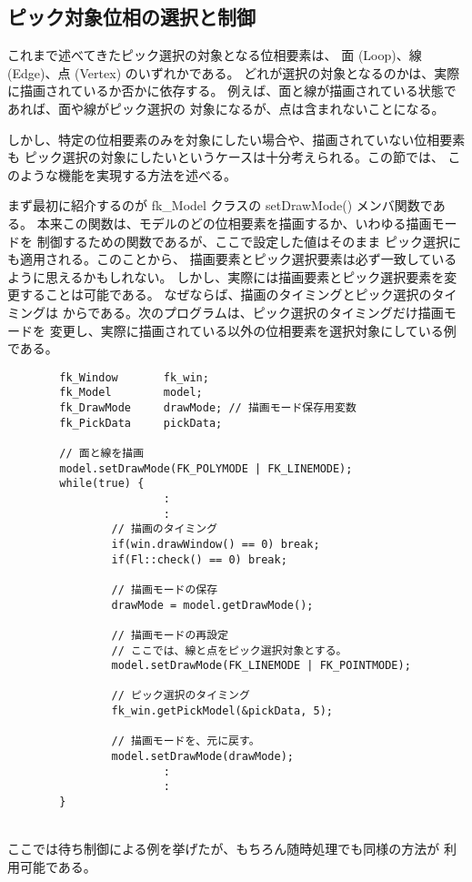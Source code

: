 \subsection{ピック対象位相の選択と制御} \label{sec:picktype}
これまで述べてきたピック選択の対象となる位相要素は、
面 (Loop)、線 (Edge)、点 (Vertex) のいずれかである。
どれが選択の対象となるのかは、実際に描画されているか否かに依存する。
例えば、面と線が描画されている状態であれば、面や線がピック選択の
対象になるが、点は含まれないことになる。

しかし、特定の位相要素のみを対象にしたい場合や、描画されていない位相要素も
ピック選択の対象にしたいというケースは十分考えられる。この節では、
このような機能を実現する方法を述べる。

まず最初に紹介するのが fk\_Model クラスの setDrawMode() メンバ関数である。
本来この関数は、モデルのどの位相要素を描画するか、いわゆる描画モードを
制御するための関数であるが、ここで設定した値はそのまま
ピック選択にも適用される。このことから、
描画要素とピック選択要素は必ず一致しているように思えるかもしれない。
しかし、実際には描画要素とピック選択要素を変更することは可能である。
なぜならば、描画のタイミングとピック選択のタイミングは
からである。次のプログラムは、ピック選択のタイミングだけ描画モードを
変更し、実際に描画されている以外の位相要素を選択対象にしている例である。
\\
\begin{breakbox}
\begin{verbatim}
        fk_Window       fk_win;
        fk_Model        model;
        fk_DrawMode     drawMode; // 描画モード保存用変数
        fk_PickData     pickData;

        // 面と線を描画
        model.setDrawMode(FK_POLYMODE | FK_LINEMODE);
        while(true) {
                        :
                        :
                // 描画のタイミング
                if(win.drawWindow() == 0) break;
                if(Fl::check() == 0) break;

                // 描画モードの保存
                drawMode = model.getDrawMode();

                // 描画モードの再設定
                // ここでは、線と点をピック選択対象とする。
                model.setDrawMode(FK_LINEMODE | FK_POINTMODE);

                // ピック選択のタイミング
                fk_win.getPickModel(&pickData, 5);

                // 描画モードを、元に戻す。
                model.setDrawMode(drawMode);
                        :
                        :
        }
\end{verbatim}
\end{breakbox}
~ \\
ここでは待ち制御による例を挙げたが、もちろん随時処理でも同様の方法が
利用可能である。

